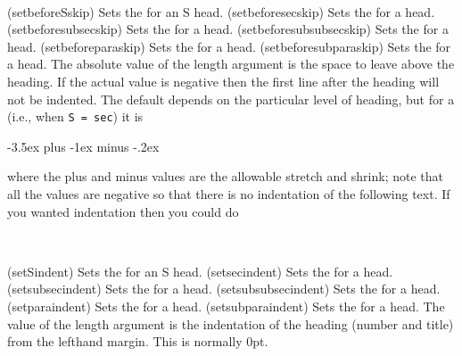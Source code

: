 \begin{syntax}
\cmd{\setbeforeSskip} \\
\end{syntax}
\glossary(setbeforeSskip)%
  {}%
  {Sets the  for an S head.}
\glossary(setbeforesecskip)%
  {}%
  {Sets the  for a  head.}
\glossary(setbeforesubsecskip)%
  {}%
  {Sets the  for a  head.}
\glossary(setbeforesubsubsecskip)%
  {}%
  {Sets the  for a  head.}
\glossary(setbeforeparaskip)%
  {}%
  {Sets the  for a  head.}
\glossary(setbeforesubparaskip)%
  {}%
  {Sets the  for a  head.}
The absolute value of the  length argument is the space to leave
above the heading. If the actual value is negative then the first line 
after the heading will not be indented. The default  depends on the
particular level of heading, but for a \cmd{\section} 
(i.e., when \verb?S = sec?) it is 
\begin{lcode}
-3.5ex plus -1ex minus -.2ex
\end{lcode}
where the plus and minus values are the
allowable stretch and shrink; note that all the values are negative so that 
there is no indentation of the following text. If you wanted indentation then
you could do
\begin{lcode}
\end{lcode}


\begin{syntax}
\cmd{\setSindent} \\
\end{syntax}
\glossary(setSindent)
  {}%
  {Sets the  for an S head.} 
\glossary(setsecindent)
  {}%
  {Sets the  for a  head.} 
\glossary(setsubsecindent)
  {}%
  {Sets the  for a  head.} 
\glossary(setsubsubsecindent)
  {}%
  {Sets the  for a  head.} 
\glossary(setparaindent)
  {}%
  {Sets the  for a  head.} 
\glossary(setsubparaindent)
  {}%
  {Sets the  for a  head.} 
The value of the  length argument is the indentation of
the heading (number and title) from the lefthand margin. 
This is normally 0pt.

